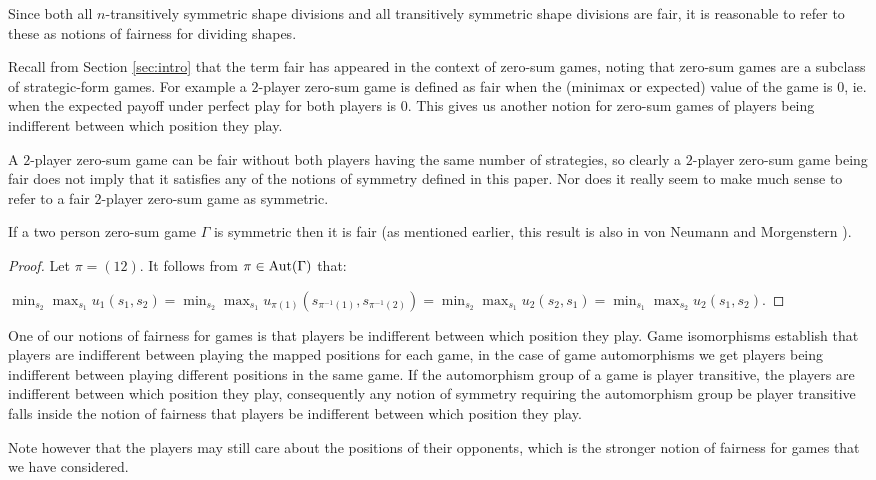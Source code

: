 Since both all $n$-transitively symmetric shape divisions and all transitively symmetric shape divisions are fair, it is reasonable to refer to these as notions of fairness for dividing shapes. 

Recall from Section \ref{sec:intro} that the term fair has appeared in the context of zero-sum games, noting that zero-sum games are a subclass of strategic-form games. For example a $2$-player zero-sum game is defined as fair when the (minimax or expected) value of the game is $0$, ie. when the expected payoff under perfect play for both players is $0$. This gives us another notion for zero-sum games of players being indifferent between which position they play. 

A $2$-player zero-sum game can be fair without both players having the same number of strategies, so clearly a $2$-player zero-sum game being fair does not imply that it satisfies any of the notions of symmetry defined in this paper. Nor does it really seem to make much sense to refer to a fair $2$-player zero-sum game as symmetric. 

\begin{theorem}
	If a two person zero-sum game $\Gamma$ is symmetric then it is fair (as mentioned earlier, this result is also in von Neumann and Morgenstern \cite[Pages 165-166]{VNM}).
	\begin{proof}
		Let $\pi = (12)$. It follows from $\pi \in \operatorname*{Aut}(\Gamma)$ that:
		
		 $\displaystyle\min_{s_2}\max_{s_1}u_1(s_1, s_2) = \min_{s_2}\max_{s_1}u_{\pi(1)}(s_{\pi^{-1}(1)}, s_{\pi^{-1}(2)}) = \min_{s_2}\max_{s_1}u_2(s_2, s_1) = \min_{s_1}\max_{s_2}u_2(s_1, s_2)$.
	\end{proof}
\end{theorem}

One of our notions of fairness for games is that players be indifferent between which position they play. Game isomorphisms establish that players are indifferent between playing the mapped positions for each game, in the case of game automorphisms we get players being indifferent between playing different positions in the same game. If the automorphism group of a game is player transitive, the players are indifferent between which position they play, consequently any notion of symmetry requiring the automorphism group be player transitive falls inside the notion of fairness that players be indifferent between which position they play. 

Note however that the players may still care about the positions of their opponents, which is the stronger notion of fairness for games that we have considered.

